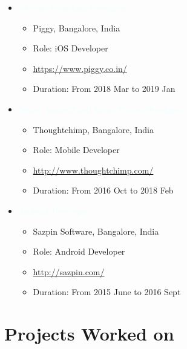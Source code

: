 \documentclass[11pt,a4paper]{moderncv}
\begin{document}
     \begin{itemize}
	 \item {\textcolor{azure}{iOS and FrontEnd Developer}}
         \begin{itemize}
		     \item Piggy, Bangalore, India
		     \item Role: iOS Developer
		     \item {\url{https://www.piggy.co.in/}}
		     \item Duration: From 2018 Mar to 2019 Jan
	 	\end{itemize}
     \end{itemize}

     \bigbreak

     \begin{itemize}
        \item {\textcolor{azure}{Senior Android and React Native Developer}}
        \begin{itemize}
            \item Thoughtchimp, Bangalore, India
            \item Role: Mobile Developer
            \item {\url{http://www.thoughtchimp.com/}}
            \item Duration: From 2016 Oct to 2018 Feb 
        \end{itemize}
     \end{itemize}

     \bigbreak

     \begin{itemize}
          \item {\textcolor{azure}{Android Developer}}
        \begin{itemize}
            \item Sazpin Software, Bangalore, India
            \item Role: Android Developer  
            \item {\url{http://sazpin.com/}}
            \item Duration: From 2015 June to 2016 Sept
        \end{itemize}
     \end{itemize}
   
\pagebreak
 
\section{Projects Worked on}
\end{document}
